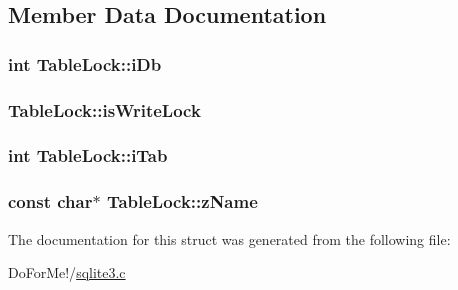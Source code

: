\subsection{Member Data Documentation}
\hypertarget{struct_table_lock_ad5cc726ef29ffcca39ec0b72942513f6}{
\subsubsection[{i\-Db}]{\setlength{\rightskip}{0pt plus 5cm}int Table\-Lock\-::i\-Db}}\label{struct_table_lock_ad5cc726ef29ffcca39ec0b72942513f6}
\hypertarget{struct_table_lock_a171121af9886ee08044d4b82b991ceeb}{
\subsubsection[{is\-Write\-Lock}]{ Table\-Lock\-::is\-Write\-Lock}}\label{struct_table_lock_a171121af9886ee08044d4b82b991ceeb}
\hypertarget{struct_table_lock_ab25b5d9ba21ed96ed68ce8064ff84e24}{
\subsubsection[{i\-Tab}]{\setlength{\rightskip}{0pt plus 5cm}int Table\-Lock\-::i\-Tab}}\label{struct_table_lock_ab25b5d9ba21ed96ed68ce8064ff84e24}
\hypertarget{struct_table_lock_ad1ce077fbd2600dd6d23ec08706dd227}{
\subsubsection[{z\-Name}]{\setlength{\rightskip}{0pt plus 5cm}const char$\ast$ Table\-Lock\-::z\-Name}}\label{struct_table_lock_ad1ce077fbd2600dd6d23ec08706dd227}


The documentation for this struct was generated from the following file\-:\begin{DoxyCompactItemize}
\item 
Do\-For\-Me!/\hyperlink{sqlite3_8c}{sqlite3.\-c}\end{DoxyCompactItemize}
